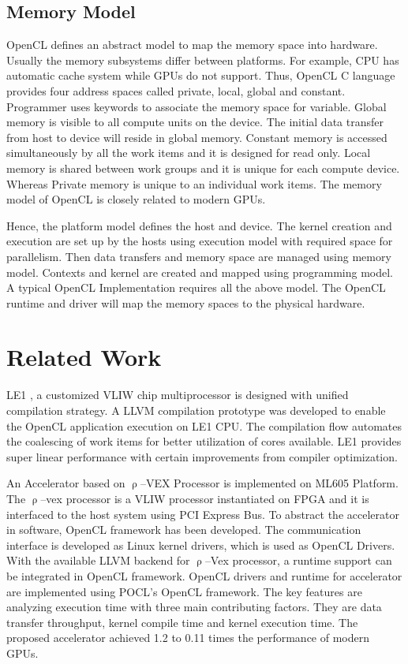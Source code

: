 \subsection{Memory Model}
OpenCL defines an abstract model to map the memory space into hardware. Usually the memory subsystems differ between platforms. For example, CPU has automatic cache system while GPUs do not support. Thus, OpenCL C language provides four address spaces called private, local, global and constant. Programmer uses keywords to associate the memory space for variable. Global memory is visible to all compute units on the device. The initial data transfer from host to device will reside in global memory. Constant memory is accessed simultaneously by all the work items and it is designed for read only. Local memory is shared between work groups and it is unique for each compute device. Whereas Private memory is unique to an individual work items. The memory model of OpenCL is closely related to modern GPUs.

Hence, the platform model defines the host and device. The kernel creation and execution are set up by the hosts using execution model with required space for parallelism. Then data transfers and memory space are managed using memory model. Contexts and kernel are created and mapped using programming model. A typical OpenCL Implementation requires all the above model. The OpenCL runtime and driver will map the memory spaces to the physical hardware.

\section{Related Work}
LE1 \cite{13}, a customized VLIW chip multiprocessor is designed with unified compilation strategy. A LLVM compilation prototype was developed to enable the OpenCL application execution on LE1 CPU. The compilation flow automates the coalescing of work items for better utilization of cores available. LE1 provides super linear performance with certain improvements from compiler optimization.

An Accelerator based on $\uprho$--VEX Processor \cite{14} is implemented on ML605 Platform. The $\uprho$--vex processor is a VLIW processor instantiated on FPGA and it is interfaced to the host system using PCI Express Bus. To abstract the accelerator in software, OpenCL framework has been developed. The communication interface is developed as Linux kernel drivers, which is used as OpenCL Drivers. With the available LLVM backend for $\uprho$--Vex processor, a runtime support can be integrated in OpenCL framework. OpenCL drivers and runtime for accelerator are implemented using POCL's OpenCL framework. The key features are analyzing execution time with three main contributing factors. They are data transfer throughput, kernel compile time and kernel execution time. The proposed accelerator achieved 1.2 to 0.11 times the performance of modern GPUs.


